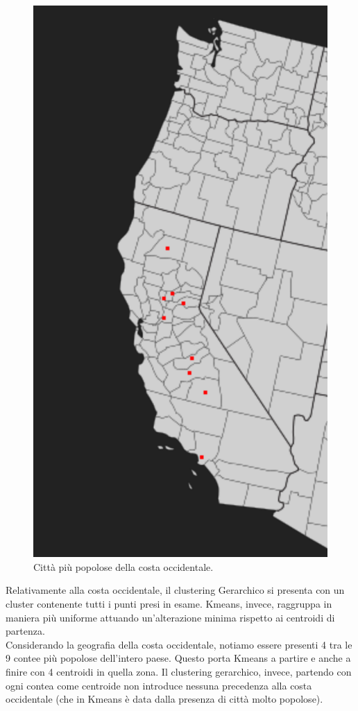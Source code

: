 \documentclass{article}
\begin{document}
\begin{figure}
	\vspace*{-0.5cm}
	\centering
	\includegraphics[width=1.0\linewidth]{figures/costa}
	\caption*{Città più popolose della costa occidentale.}
\end{figure}
Relativamente alla costa occidentale, il clustering Gerarchico si presenta con un cluster contenente tutti i punti presi in esame. Kmeans, invece, raggruppa in maniera più uniforme attuando un'alterazione minima rispetto ai centroidi di partenza.\\
Considerando la geografia della costa occidentale, notiamo essere presenti 4 tra le 9 contee più popolose dell'intero paese.
Questo porta Kmeans a partire e anche a finire con 4 centroidi in quella zona.
Il clustering gerarchico, invece, partendo con ogni contea come centroide non introduce nessuna precedenza alla costa occidentale (che in Kmeans è data dalla presenza di città molto popolose).\\
\end{document}

